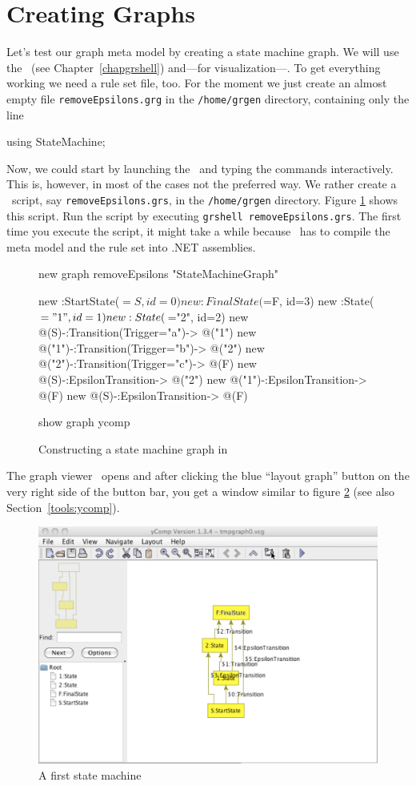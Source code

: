 \section{Creating Graphs}
\label{sct:quick:create}
Let's test our graph meta model by creating a state machine graph.
We will use the \GrShell\ (see Chapter~\ref{chapgrshell}) and---for visualization---\yComp.
To get everything working we need a rule set file, too.
For the moment we just create an almost empty file \texttt{removeEpsilons.grg} in the \texttt{/home/grgen} directory, containing only the line
\begin{grgen}
using StateMachine;
\end{grgen}
Now, we could start by launching the \GrShell\ and typing the commands interactively.
This is, however, in most of the cases not the preferred way.
We rather create a \GrShell\ script, say \texttt{removeEpsilons.grs}, in the \texttt{/home/grgen} directory.
Figure \ref{fig:quick:shell} shows this script.
Run the script by executing \texttt{grshell removeEpsilons.grs}.
The first time you execute the script, it might take a while because \GrG\ has to compile the meta model and the rule set into .NET assemblies.
\begin{figure}[htbp]
    \centering
    \begin{grgen}
new graph removeEpsilons "StateMachineGraph"

new :StartState($=S, id=0)
new :FinalState($=F, id=3)
new :State($="1", id=1)
new :State($="2", id=2)
new @(S)-:Transition(Trigger="a")-> @("1")
new @("1")-:Transition(Trigger="b")-> @("2")
new @("2")-:Transition(Trigger="c")-> @(F)
new @(S)-:EpsilonTransition-> @("2")
new @("1")-:EpsilonTransition-> @(F)
new @(S)-:EpsilonTransition-> @(F)

show graph ycomp
    \end{grgen}
    \caption{Constructing a state machine graph in \GrShell}
    \label{fig:quick:shell}
\end{figure}
The graph viewer \yComp\ opens and after clicking the blue ``layout graph'' button on the very right side of the button bar, you get a window similar to figure \ref{fig:quick:ycomp} (see also Section~\ref{tools:ycomp}).
\begin{figure}[htbp]
	\centering
	\includegraphics[width=0.8\linewidth]{fig/quickycomp}
	\caption{A first state machine}
	\label{fig:quick:ycomp}
\end{figure}
